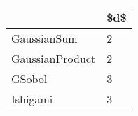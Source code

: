\begin{tabular}{ll}
\toprule
{} & \$d\$ \\
\midrule
GaussianSum     &   2 \\
GaussianProduct &   2 \\
GSobol          &   3 \\
Ishigami        &   3 \\
\bottomrule
\end{tabular}
